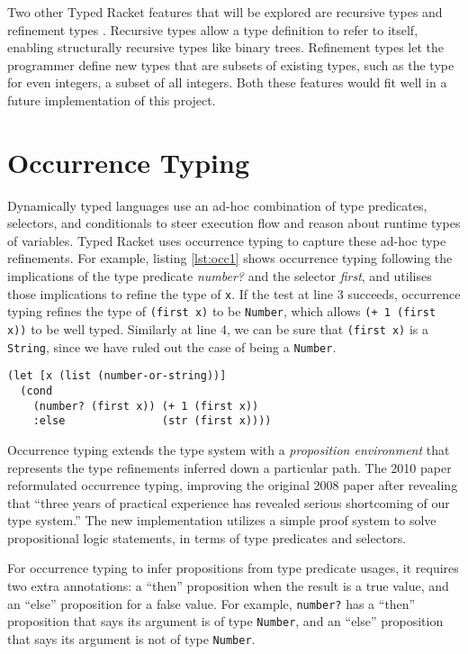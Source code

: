 Two other Typed Racket features that will be explored are recursive types and refinement types  
\cite{Tob10}. Recursive types allow a type definition to refer to itself, enabling structurally
recursive types like binary trees. Refinement types let the programmer define
new types that are subsets of existing types, such as the type for even integers, a subset of all integers.
Both these features would fit well in a future implementation of this project.

\section{Occurrence Typing}
\label{sec:OccurrenceTyping}

Dynamically typed languages use an ad-hoc combination of type predicates,
selectors, and conditionals to steer execution flow and reason about runtime types of variables.
Typed Racket uses occurrence typing to capture these ad-hoc type refinements.
For example, listing \ref{lst:occ1} shows occurrence typing following the implications 
of the type predicate \emph{number?} and the selector \emph{first}, and utilises those implications to refine
the type of \lstinline|x|. If the test at line 3 succeeds, occurrence typing refines the
type of \lstinline|(first x)| to be \lstinline|Number|, which allows \lstinline|(+ 1 (first x))|
to be well typed. Similarly at line 4, we can be sure that \lstinline|(first x)| is
a \lstinline|String|, since we have ruled out the case of being a \lstinline|Number|.

\begin{lstlisting}[caption=A well typed form utilising occurrence typing with Clojure syntax, label=lst:occ1]
(let [x (list (number-or-string))]
  (cond 
    (number? (first x)) (+ 1 (first x))
    :else               (str (first x))))
\end{lstlisting}

Occurrence typing \cite{TF08}
\cite{TF10} extends the type 
system with a \emph{proposition environment} that represents 
the type refinements inferred down a particular path.
The 2010 paper \cite{TF10}
reformulated occurrence typing, improving the original 2008 paper
\cite{TF08}
after revealing that ``three years of practical experience has revealed
serious shortcoming of our type system.''\cite{TF10}
The new implementation utilizes a simple proof system to solve
propositional logic statements, in terms of type predicates and selectors.

For occurrence typing to infer propositions from type predicate usages, it requires 
two extra annotations: a ``then'' proposition
when the result is a true value, and an ``else'' proposition for a false value.
For example, \lstinline|number?| has a ``then'' proposition that says its argument
is of type \lstinline|Number|, and an ``else'' proposition that says its argument is not of type \lstinline|Number|.

